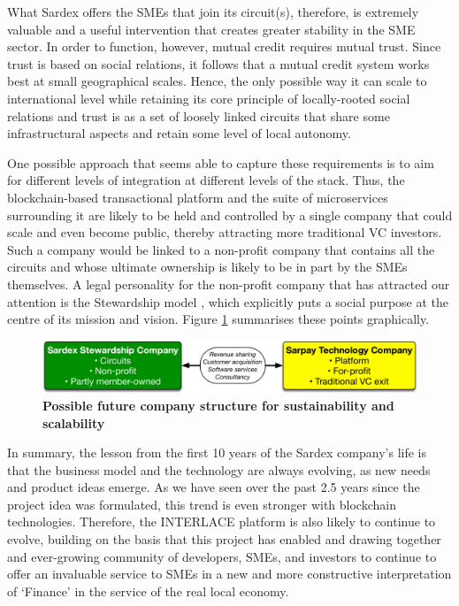 What Sardex offers the SMEs that join its circuit(s), therefore, is extremely valuable and a useful intervention that creates greater stability in the SME sector. In order to function, however, mutual credit requires mutual trust. Since trust is based on social relations, it follows that a mutual credit system works best at small geographical scales. Hence, the only possible way it can scale to international level while retaining its core principle of locally-rooted social relations and trust is as a set of loosely linked circuits that share some infrastructural aspects and retain some level of local autonomy.

One possible approach that seems able to capture these requirements is to aim for different levels of integration at different levels of the stack. Thus, the blockchain-based transactional platform and the suite of microservices surrounding it are likely to be held and controlled by a single company that could scale and even become public, thereby attracting more traditional VC investors. Such a company would be linked to a non-profit company that contains all the circuits and whose ultimate ownership is likely to be in part by the SMEs themselves. A legal personality for the non-profit company that has attracted our attention is the Stewardship model \cite{Karns2011}, which explicitly puts a social purpose at the centre of its mission and vision. Figure \ref{fig:structure} summarises these points graphically.

\begin{figure}[h]
\centering
\includegraphics[width=16 cm]{Figures/structure}
\caption{\bf \small Possible future company structure for sustainability and scalability}
\label{fig:structure}
\end{figure}

In summary, the lesson from the first 10 years of the Sardex company's life is that the business model and the technology are always evolving, as new needs and product ideas emerge. As we have seen over the past 2.5 years since the project idea was formulated, this trend is even stronger with blockchain technologies. Therefore, the INTERLACE platform is also likely to continue to evolve, building on the basis that this project has enabled and drawing together and ever-growing community of developers, SMEs, and investors to continue to offer an invaluable service to SMEs in a new and more constructive interpretation of `Finance' in the service of the real local economy.




















